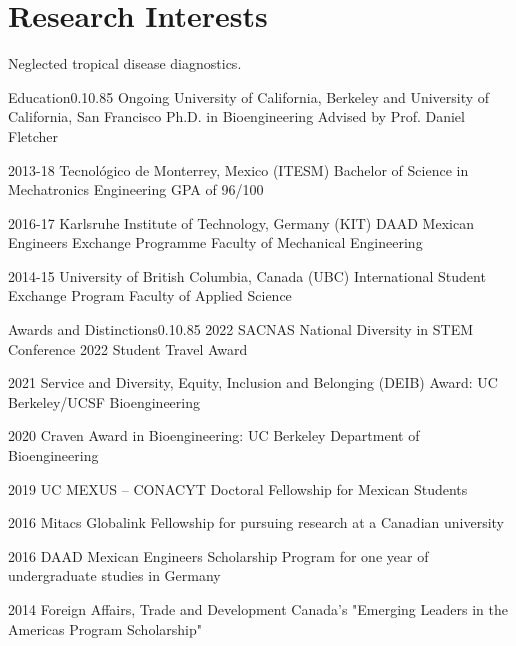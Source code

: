 \documentclass{federico_cv}
\begin{document}
{}
{}


\section{Research Interests}
Neglected tropical disease diagnostics.


\begin{tblSection}{Education}{0.1}{0.85}
\degree
{Ongoing}
{University of California, Berkeley and University of California, San Francisco}
{Ph.D. in Bioengineering}
{Advised by Prof. Daniel Fletcher}

\degree
{2013-18}
{Tecnológico de Monterrey, Mexico (ITESM)}
{Bachelor of Science in Mechatronics Engineering}
{GPA of 96/100}

\degree
{2016-17}
{Karlsruhe Institute of Technology, Germany (KIT)}
{DAAD Mexican Engineers Exchange Programme}
{Faculty of Mechanical Engineering}

\degree
{2014-15}
{University of British Columbia, Canada (UBC)}
{International Student Exchange Program}
{Faculty of Applied Science}

\end{tblSection}


\nocite{*}
\printbibliography[keyword={Publications},title={Publications},resetnumbers=true]



\begin{tblSection}{Awards and Distinctions}{0.1}{0.85}
\award
{2022}
{SACNAS National Diversity in STEM Conference 2022 Student Travel Award}

\award
{2021}
{Service and Diversity, Equity, Inclusion and Belonging (DEIB) Award: UC Berkeley/UCSF Bioengineering}

\award
{2020}
{Craven Award in Bioengineering: UC Berkeley Department of Bioengineering}

\award
{2019}
{UC MEXUS – CONACYT Doctoral Fellowship for Mexican Students}

\award
{2016}
{Mitacs Globalink Fellowship for pursuing research at a Canadian university}

\award
{2016}
{DAAD Mexican Engineers Scholarship Program for one year of undergraduate studies in Germany}

\award
{2014}
{Foreign Affairs, Trade and Development Canada's "Emerging Leaders in the Americas Program Scholarship"}

\end{tblSection}
\end{document}
